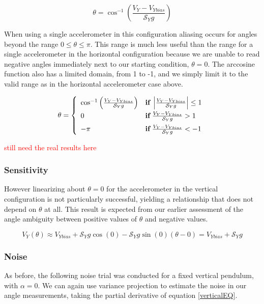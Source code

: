 \documentclass{article}
\newcommand{\xxx}[1]{\textcolor{red}{#1}}
\theoremstyle{plain}
\theoremstyle{definition}
\theoremstyle{remark}
\newcommand{\Sens}{\mathcal{S}}
\begin{document}
\begin{equation}
\theta = \cos^{-1}\left( \frac{V_{Y} - V_{Ybias}}{\Sens_{Y} g}\right)
\label{verticalEQ}
\end{equation}

When using a single accelerometer in this configuration aliasing occurs for angles beyond the range $0 \leq \theta \leq \pi$.  This range is much less useful than the range for a single accelerometer in the horizontal configuration because we are unable to read negative angles immediately next to our starting condition, $\theta = 0$.  The arccosine function also has a limited domain, from 1 to -1, and we simply limit it to the valid range as in the horizontal accelerometer case above.

$$\theta = \left\{ 
	\begin{array}{l l}
		\cos^{-1}\left( \frac{V_{Y} - V_{Ybias}}{\Sens_{Y} g}\right) & {\bf{if }} \, \left| \frac{V_{Y} - V_{Ybias}}{\Sens_{Y} g} \right| \leq 1 \\[6pt]
		0 & {\bf{if }} \, \frac{V_{Y} - V_{Ybias}}{\Sens_{Y} g} > 1 \\[6pt]
		-\pi & {\bf{if} } \, \frac{V_{Y} - V_{Ybias}}{\Sens_{Y} g} < -1
	\end{array} \right. $$

\xxx{still need the real results here}

\subsubsection{Sensitivity}

However linearizing about $\theta = 0$ for the accelerometer in the vertical configuration is not particularly successful,  yielding a relationship that does not depend on $\theta$ at all.  This result is expected from our earlier assessment of the angle ambiguity between positive values of $\theta$ and negative values.  

$$V_{Y}(\theta) \approx V_{Ybias} + \Sens_{Y} g \cos(0) - \Sens_{Y} g \sin(0) (\theta - 0) = V_{Ybias} + \Sens_{Y} g $$

\subsubsection{Noise}

As before, the following noise trial was conducted for a fixed vertical pendulum, with $\alpha = 0$. We can again use variance projection to estimate the noise in our angle measurements, taking the partial derivative of equation \ref{verticalEQ}.
\end{document}
